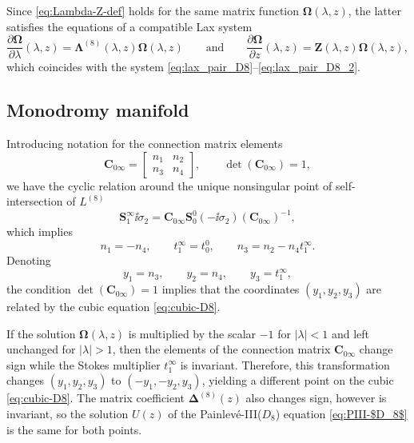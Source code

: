 Since \eqref{eq:Lambda-Z-def} holds for the same matrix function $\mathbf{\Omega}(\lambda,z)$, the latter satisfies the equations of a compatible Lax system
\begin{equation}
 \frac{\partial\mathbf{\Omega}}{\partial\lambda}(\lambda,z)=\mathbf{\Lambda}^{(8)}(\lambda,z)\mathbf{\Omega}(\lambda,z)\qquad\text{and}\qquad\frac{\partial\mathbf{\Omega}}{\partial z}(\lambda,z)=\mathbf{Z}(\lambda,z)\mathbf{\Omega}(\lambda,z),
\label{eq:Lax-system}
\end{equation}
which coincides with the system \eqref{eq:lax_pair_D8}--\eqref{eq:lax_pair_D8_2}.

\subsection{Monodromy manifold}
\label{sec:monodromy-rep-$D_8$-manifold}
Introducing notation for the connection matrix elements
\begin{equation*}
 \mathbf{C}_{0\infty}=\begin{bmatrix}
 n_1&n_2\\n_3&n_4
 \end{bmatrix},\qquad \det(\mathbf{C}_{0\infty})=1,
\end{equation*}
we have the cyclic relation around the unique nonsingular point of self-intersection of $L^{(8)}$
 \begin{equation*}%
\mathbf{S}^\infty_{{1}}\ii\sigma_2= \mathbf{C}_{0\infty}\mathbf{S}^0_{{0}}(-\ii\sigma_2)(\mathbf{C}_{0\infty})^{-1},
\end{equation*}
which implies
\[
n_1=-n_4,\qquad t_1^{\infty}=t_{0}^0,\qquad n_3=n_2-n_4t_1^{\infty}.
\]
Denoting
\[
y_1=n_3,\qquad y_2=n_4,\qquad y_3=t_1^{\infty},
\]
the condition $\det(\mathbf{C}_{0\infty})=1$ implies that the coordinates $(y_1,y_2,y_3)$ are related by the cubic equation \eqref{eq:cubic-D8}.

\begin{Remark}
 If the solution $\mathbf{\Omega}(\lambda,z)$ is multiplied by the scalar $-1$ for $|\lambda|<1$ and left unchanged for $|\lambda|>1$, then the elements of the connection matrix $\mathbf{C}_{0\infty}$ change sign while the Stokes multiplier $t_1^\infty$ is invariant. Therefore, this transformation changes $(y_1,y_2,y_3)$ to $(-y_1,-y_2,y_3)$, yielding a different point on the cubic \eqref{eq:cubic-D8}. The matrix coefficient $\mathbf{\Delta}^{(8)}(z)$ also changes sign, however  is invariant, so the solution $U(z)$ of the Painlev\'e-III($D_8$) equation \eqref{eq:PIII-$D_8$} is the same for both points.
 \label{rem:minus-y1-y2}
\end{Remark}

